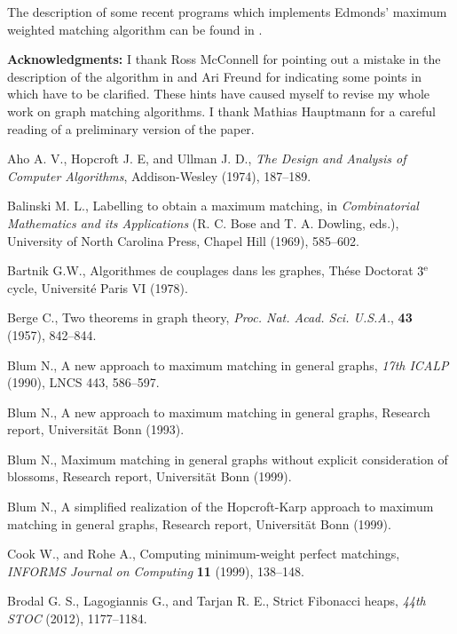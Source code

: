 \documentclass[12pt,twoside,a4paper]{article}
\begin{document}
The description of some recent programs which implements Edmonds' maximum weighted 
matching algorithm can be found in \cite{CoRo, MeSc, Ko}.

\medskip
\noindent
{\bf Acknowledgments:} 
I thank Ross McConnell for pointing out a mistake in the description of the
algorithm in \cite{Bl3} and Ari Freund for indicating some points in 
\cite{Bl2} which have to be clarified. These hints
have caused myself to revise my whole work on graph matching algorithms.
I thank Mathias Hauptmann for a careful reading of a preliminary version of the paper.

\begin{thebibliography}{99}
\frenchspacing

 Aho A. V., Hopcroft J. E, and Ullman J. D.,
{\em The Design and Analysis of Computer Algorithms\/},
Addison-Wesley (1974), 187--189.

 Balinski M. L.,
Labelling to obtain a maximum matching, in {\em Combinatorial Mathematics
and its Applications\/} (R. C. Bose and T. A. Dowling, eds.),
University of North Carolina Press, Chapel Hill (1969), 585--602.



 Bartnik G.W.,
Algorithmes de couplages dans les graphes,
Th\'ese Doctorat $3^{\rm e}$ cycle, Universit\'e Paris VI (1978).

 Berge C.,
Two theorems in graph theory, {\em Proc. Nat. Acad. Sci. U.S.A.\/},
{\bf 43} (1957), 842--844.

 Blum N., A new approach to maximum matching in general graphs,
{\em 17th ICALP\/} (1990), LNCS 443, 586--597.

 Blum N., A new approach to maximum matching in general graphs,
Research report, Universit\"at Bonn (1993).

 Blum N., Maximum matching in general graphs without explicit
consideration of blossoms, Research report, Universit\"at Bonn (1999).

 Blum N., A simplified realization of the Hopcroft-Karp approach
to maximum matching in general graphs, Research report, Universit\"at
Bonn (1999).

 Cook W., and Rohe A., Computing minimum-weight perfect matchings,
{\em INFORMS Journal on Computing\/} {\bf 11} (1999), 138--148.

 Brodal G. S., Lagogiannis G., and Tarjan R. E.,
Strict Fibonacci heaps, {\em 44th STOC\/} (2012), 1177--1184.




\end{thebibliography}
\end{document}
